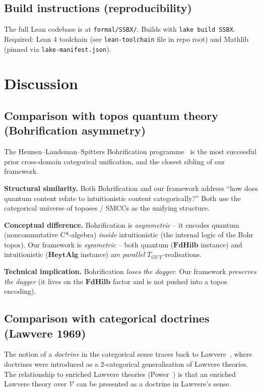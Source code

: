 \documentclass[11pt,a4paper]{article}
\theoremstyle{plain}
\theoremstyle{definition}
\theoremstyle{remark}
\newcommand{\cat}[1]{\mathbf{#1}}
\newcommand{\HeytAlg}{\cat{HeytAlg}}
\newcommand{\FdHilb}{\cat{FdHilb}}
\newcommand{\TGUT}{T_{\mathrm{GUT}}}
\newcommand{\smcc}{SMCC}
\begin{document}
\subsection{Build instructions (reproducibility)}\label{sec:lean:build}

The full Lean codebase is at \texttt{formal/SSBX/}. Builds with \texttt{lake build SSBX}. Required: Lean 4 toolchain (see \texttt{lean-toolchain} file in repo root) and Mathlib (pinned via \texttt{lake-manifest.json}).

\section{Discussion}\label{sec:disc}

\subsection{Comparison with topos quantum theory (Bohrification asymmetry)}\label{sec:disc:bohr}

The Heunen--Landsman--Spitters Bohrification programme~\cite{HLS09,HLSW12,DI08} is the most successful prior cross-domain categorical unification, and the closest sibling of our framework.

\textbf{Structural similarity.} Both Bohrification and our framework address ``how does quantum content relate to intuitionistic content categorically?'' Both use the categorical universe of toposes / \smcc{}s as the unifying structure.

\textbf{Conceptual difference.} Bohrification is \emph{asymmetric} -- it encodes quantum (noncommutative C*-algebra) \emph{inside} intuitionistic (the internal logic of the Bohr topos). Our framework is \emph{symmetric} -- both quantum ($\FdHilb$ instance) and intuitionistic ($\HeytAlg$ instance) are \emph{parallel} $\TGUT$-realisations.

\textbf{Technical implication.} Bohrification \emph{loses the dagger}. Our framework \emph{preserves the dagger} (it lives on the $\FdHilb$ factor and is not pushed into a topos encoding).

\subsection{Comparison with categorical doctrines (Lawvere 1969)}\label{sec:disc:lawvere}

The notion of a \emph{doctrine} in the categorical sense traces back to Lawvere~\cite{Law69}, where doctrines were introduced as a 2-categorical generalisation of Lawvere theories. The relationship to enriched Lawvere theories (Power~\cite{Pow99}) is that an enriched Lawvere theory over $\mathcal{V}$ can be presented as a doctrine in Lawvere's sense.
\end{document}
